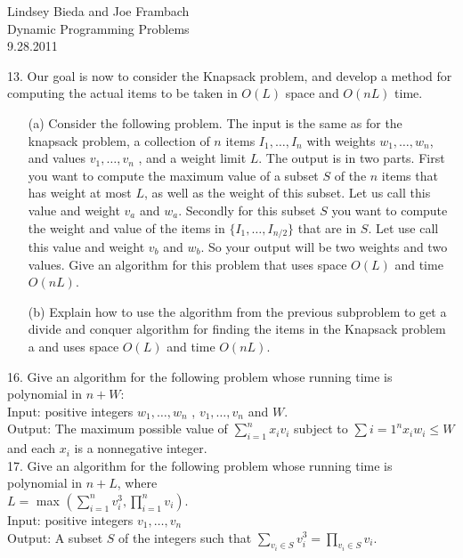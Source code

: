 \documentclass[10pt]{article}
\begin{document}
	\begin{flushright}
	Lindsey Bieda and Joe Frambach\\
	Dynamic Programming Problems\\
	9.28.2011
	\end{flushright}
	13.	Our goal is now to consider the Knapsack problem, and develop a method for computing the actual
			items to be taken in $O(L)$ space and $O(nL)$ time.
	\begin{enumerate}
		\item[(a)]	Consider the following problem. The input is the same as for the knapsack problem, a collection
								of $n$ items $I_1, \ldots, I_n$ with weights $w_1, \ldots, w_n$, and values $v_1, \ldots, v_n$ , and a weight limit $L$.  The
								output is in two parts.  First you want to compute the maximum value of a subset $S$ of the $n$
								items that has weight at most $L$, as well as the weight of this subset.  Let us call this value and
								weight $v_a$ and $w_a$.  Secondly for this subset $S$ you want to compute the weight and value of the
								items in $\{I_1, \ldots, I_{n/2}\}$ that are in $S$. Let use call this value and weight $v_b$ and $w_b$. So your output
								will be two weights and two values. Give an algorithm for this problem that uses space $O(L)$ and
								time $O(nL)$.
		\item[(b)]	Explain how to use the algorithm from the previous subproblem to get a divide and conquer
								algorithm for finding the items in the Knapsack problem a and uses space $O(L)$ and time $O(nL)$. 
	\end{enumerate}
	
	16.	Give an algorithm for the following problem whose running time is polynomial in $n + W$:\\
			Input: positive integers $w_1, \ldots, w_n$ , $v_1, \ldots, v_n$ and $W$.\\
			Output:  The maximum possible value of $\sum_{i=1}^n x_i v_i$ subject to $\sum{i=1}^n x_i w_i \leq W$ and each $x_i$ is a
			nonnegative integer.\\
	
	17. Give an algorithm for the following problem whose running time is polynomial in $n + L$, where \\
			$L =$ max $(\sum_{i=1}^n v_i^3, \prod_{i=1}^n v_i)$.\\
			Input: positive integers $v_1, \ldots, v_n$\\
			Output: A subset $S$ of the integers such that $\sum_{v_i \in S} v_i^3 = \prod_{v_i \in S} v_i$.
	
\end{document}

